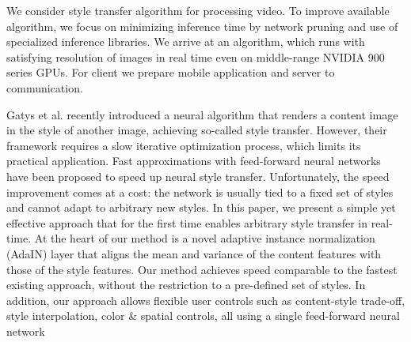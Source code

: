 \documentclass[../Main.tex]{subfiles}
\begin{document}
We consider style transfer algorithm for processing video. 
To improve available algorithm, we focus on minimizing inference time by
network pruning and use of specialized inference libraries. We arrive at an algorithm, 
which runs with satisfying resolution of images in real time even on middle-range
NVIDIA 900 series GPUs. For client we prepare mobile application and server to communication.

Gatys et al. recently introduced a neural algorithm that
renders a content image in the style of another image,
achieving so-called style transfer. However, their framework requires a slow iterative optimization process, which
limits its practical application. Fast approximations with
feed-forward neural networks have been proposed to speed
up neural style transfer. Unfortunately, the speed improvement comes at a cost: the network is usually tied to a fixed
set of styles and cannot adapt to arbitrary new styles. In this
paper, we present a simple yet effective approach that for the
first time enables arbitrary style transfer in real-time. At the
heart of our method is a novel adaptive instance normalization (AdaIN) layer that aligns the mean and variance of the
content features with those of the style features. Our method
achieves speed comparable to the fastest existing approach,
without the restriction to a pre-defined set of styles. In addition, our approach allows flexible user controls such as
content-style trade-off, style interpolation, color \& spatial
controls, all using a single feed-forward neural network

\par\vspace*{\fill} %


\biblio %
\end{document}
